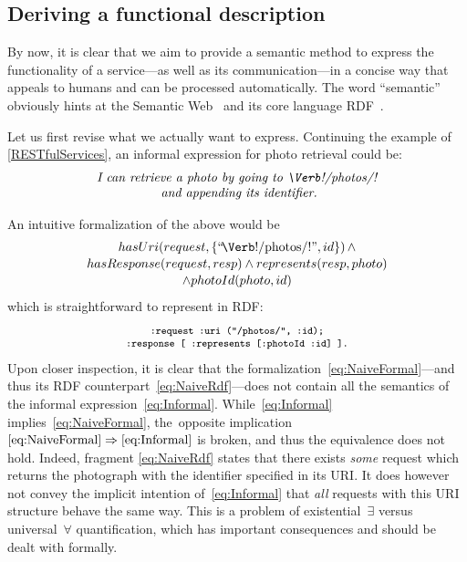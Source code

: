 \documentclass[runningheads,a4paper, twocolumn]{llncs}
\begin{document}
\subsection{Deriving a functional description}
\label{subsec:FunctionDescription}
By now, it is clear that we aim to provide a semantic method to express the functionality of a service---as well as its communication---in a concise way that appeals to humans and can be processed automatically. The word ``semantic'' obviously hints at the Semantic Web~\cite{SemanticWeb} and its core language RDF~\cite{RDF}.

Let us first revise what we actually want to express. Continuing the example of \autoref{RESTfulServices}, an informal expression for photo retrieval could be:
\begin{multline}\label{eq:Informal}
    \textit{I can retrieve a photo by going to \Verb!/photos/!}\\[-.3em]
    \textit{ and appending its identifier.}
\end{multline}

\noindent An intuitive formalization of the above would be
\begin{multline}\label{eq:NaiveFormal}
    \makebox[5.2cm]{$hasUri(request, \{\mbox{``\!\Verb!/photos/!''}, id\})\, \land$} \\[-.2em]
    hasResponse(request, resp) \land represents(resp, photo)\\[-.2em]
    \land photoId(photo, id)
\end{multline}
which is straightforward to represent in RDF:
\begin{multline}\label{eq:NaiveRdf}
    \fontsize{8}{10}\texttt{:request :uri ("/photos/", :id);} \\[-.5em]
    \fontsize{8}{10}\texttt{:response [ :represents [:photoId :id] ].}
\end{multline}
Upon closer inspection, it is clear that the formalization~\ref{eq:NaiveFormal}---and thus its RDF counterpart~\ref{eq:NaiveRdf}---does not contain all the semantics of the informal expression~\ref{eq:Informal}. While~\ref{eq:Informal} implies~\ref{eq:NaiveFormal}, the~opposite implication \mbox{$\ref{eq:NaiveFormal} \Rightarrow \ref{eq:Informal}$} is broken, and thus the equivalence does not hold. Indeed, fragment \ref{eq:NaiveRdf} states that there exists \emph{some} request which returns the photograph with the identifier specified in its URI. It does however not convey the implicit intention of~\ref{eq:Informal} that \emph{all} requests with this URI structure behave the same way. This is a problem of existential~$\exists$ versus universal~$\forall$ quantification, which has important consequences and should be dealt with formally.
\end{document}

